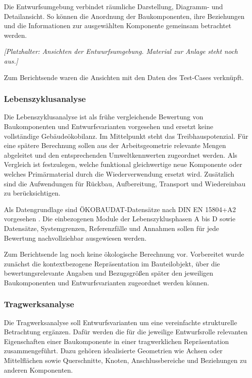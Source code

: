 \documentclass[type=zwischenbericht,theme=dark]{zukunftbau}
\begin{document}
Die Entwurfsumgebung verbindet räumliche Darstellung, Diagramm- und Detailansicht. So können die Anordnung der Baukomponenten, ihre Beziehungen und die Informationen zur ausgewählten Komponente gemeinsam betrachtet werden.

\begin{Figure}[title=Ansichten der Entwurfsumgebung]
\textit{[Platzhalter: Ansichten der Entwurfsumgebung. Material zur Anlage steht noch aus.]}
\end{Figure}

Zum Berichtsende waren die Ansichten mit den Daten des Test-Cases verknüpft.

\subsubsection{Lebenszyklusanalyse}
Die Lebenszyklusanalyse ist als frühe vergleichende Bewertung von Baukomponenten und Entwurfsvarianten vorgesehen und ersetzt keine vollständige Gebäudeökobilanz. Im Mittelpunkt steht das Treibhauspotenzial. Für eine spätere Berechnung sollen aus der Arbeitsgeometrie relevante Mengen abgeleitet und den entsprechenden Umweltkennwerten zugeordnet werden. Als Vergleich ist festzulegen, welche funktional gleichwertige neue Komponente oder welches Primärmaterial durch die Wiederverwendung ersetzt wird. Zusätzlich sind die Aufwendungen für Rückbau, Aufbereitung, Transport und Wiedereinbau zu berücksichtigen.

Als Datengrundlage sind ÖKOBAUDAT-Datensätze nach DIN EN 15804+A2 vorgesehen \cite{din-en-15804-umweltproduktdeklarationen-2022,bbsr-oekobaudat-handbuch-2023}. Die einbezogenen Module der Lebenszyklusphasen A bis D sowie Datensätze, Systemgrenzen, Referenzfälle und Annahmen sollen für jede Bewertung nachvollziehbar ausgewiesen werden.

Zum Berichtsende lag noch keine ökologische Berechnung vor. Vorbereitet wurde zunächst die kontextbezogene Repräsentation im Bauteilobjekt, über die bewertungsrelevante Angaben und Bezugsgrößen später den jeweiligen Baukomponenten und Entwurfsvarianten zugeordnet werden können.

\subsubsection{Tragwerksanalyse}
Die Tragwerksanalyse soll Entwurfsvarianten um eine vereinfachte strukturelle Betrachtung ergänzen. Dafür werden die für die jeweilige Entwurfsrolle relevanten Eigenschaften einer Baukomponente in einer tragwerklichen Repräsentation zusammengeführt. Dazu gehören idealisierte Geometrien wie Achsen oder Mittelflächen sowie Querschnitte, Knoten, Anschlussbereiche und Beziehungen zu anderen Komponenten.
\end{document}
